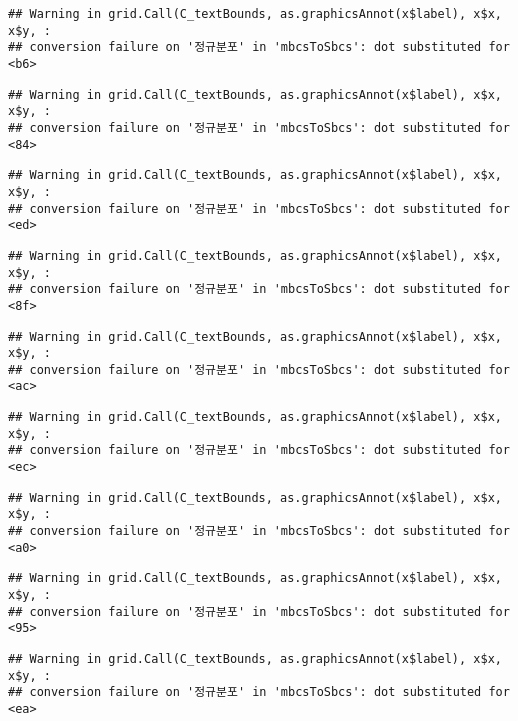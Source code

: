 \documentclass[]{book}
\begin{document}
\begin{verbatim}
## Warning in grid.Call(C_textBounds, as.graphicsAnnot(x$label), x$x, x$y, :
## conversion failure on '정규분포' in 'mbcsToSbcs': dot substituted for <b6>
\end{verbatim}

\begin{verbatim}
## Warning in grid.Call(C_textBounds, as.graphicsAnnot(x$label), x$x, x$y, :
## conversion failure on '정규분포' in 'mbcsToSbcs': dot substituted for <84>
\end{verbatim}

\begin{verbatim}
## Warning in grid.Call(C_textBounds, as.graphicsAnnot(x$label), x$x, x$y, :
## conversion failure on '정규분포' in 'mbcsToSbcs': dot substituted for <ed>
\end{verbatim}

\begin{verbatim}
## Warning in grid.Call(C_textBounds, as.graphicsAnnot(x$label), x$x, x$y, :
## conversion failure on '정규분포' in 'mbcsToSbcs': dot substituted for <8f>
\end{verbatim}

\begin{verbatim}
## Warning in grid.Call(C_textBounds, as.graphicsAnnot(x$label), x$x, x$y, :
## conversion failure on '정규분포' in 'mbcsToSbcs': dot substituted for <ac>
\end{verbatim}

\begin{verbatim}
## Warning in grid.Call(C_textBounds, as.graphicsAnnot(x$label), x$x, x$y, :
## conversion failure on '정규분포' in 'mbcsToSbcs': dot substituted for <ec>
\end{verbatim}

\begin{verbatim}
## Warning in grid.Call(C_textBounds, as.graphicsAnnot(x$label), x$x, x$y, :
## conversion failure on '정규분포' in 'mbcsToSbcs': dot substituted for <a0>
\end{verbatim}

\begin{verbatim}
## Warning in grid.Call(C_textBounds, as.graphicsAnnot(x$label), x$x, x$y, :
## conversion failure on '정규분포' in 'mbcsToSbcs': dot substituted for <95>
\end{verbatim}

\begin{verbatim}
## Warning in grid.Call(C_textBounds, as.graphicsAnnot(x$label), x$x, x$y, :
## conversion failure on '정규분포' in 'mbcsToSbcs': dot substituted for <ea>
\end{verbatim}
\end{document}
